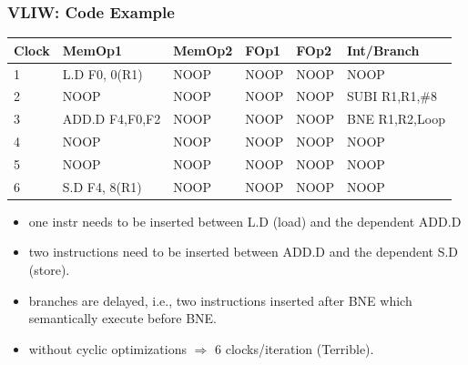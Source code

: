 \documentclass{beamer}
\begin{document}
\begin{frame}[fragile,t]
    \frametitle{VLIW: Code Example}


\begin{tiny}
\begin{tabular}{llllll}
\hline
Clock   & MemOp1          & MemOp2 & FOp1  & FOp2 & Int/Branch    \\\hline
1       & L.D   F0, 0(R1) & NOOP   & NOOP  & NOOP & NOOP \\
2       & NOOP            & NOOP   & NOOP  & NOOP & SUBI R1,R1,\#8\\
3       & ADD.D F4,F0,F2  & NOOP   & NOOP  & NOOP & BNE R1,R2,Loop\\
4       & NOOP            & NOOP   & NOOP  & NOOP & NOOP\\
5       & NOOP            & NOOP   & NOOP  & NOOP & NOOP\\
6       & S.D F4, 8(R1)   & NOOP   & NOOP  & NOOP & NOOP\\\hline
\end{tabular}
\end{tiny}

\smallskip

\begin{itemize}
    \item one instr needs to be inserted between L.D (load)
            and the dependent ADD.D
    \item two instructions need to be inserted between ADD.D
            and the dependent S.D (store).
    \item branches are delayed, i.e., two instructions inserted
            after BNE which semantically execute before BNE.
    \item without cyclic optimizations $\Rightarrow$ \alert{6 clocks/iteration (Terrible)}.
\end  {itemize}

\end{frame}
\end{document}
